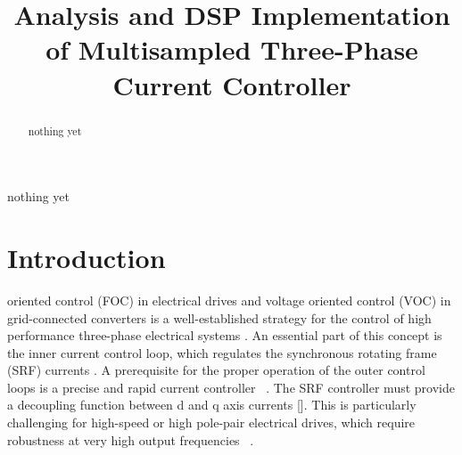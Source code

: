 \documentclass[journal]{IEEEtran}
\begin{document}
\title{Analysis and DSP Implementation of Multisampled Three-Phase Current Controller}


\maketitle

\begin{abstract}
nothing yet
\end{abstract}

\begin{IEEEkeywords}
nothing yet
\end{IEEEkeywords}


\IEEEpeerreviewmaketitle

\section{Introduction}
 oriented control (FOC) in electrical drives and voltage oriented control (VOC) in grid-connected converters is a well-established strategy for the control of high performance three-phase electrical systems \cite{holmes2012}. An essential part of this concept is the inner current control loop, which regulates the synchronous rotating frame (SRF) currents \cite{holmes2009}. A prerequisite for the proper operation of the outer control loops is a precise and rapid current controller ~\cite{yepes2014,choi1998}. The SRF controller must provide a decoupling function between d and q axis currents []. This is particularly challenging for high-speed or high pole-pair electrical drives, which require robustness at very high output frequencies ~\cite{choi1998,hoffmann2016,yim2009}. 
\end{document}
